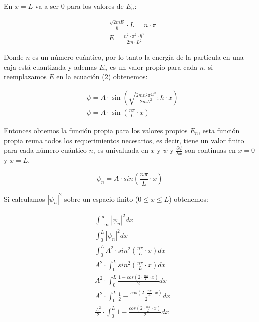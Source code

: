 \documentclass[a4paper]{article}
\begin{document}
        \indent En $x = L$ va a ser 0 para los valores de $E_n$:
        \vspace{-1mm}

        \begin{align*}
            &\frac{\sqrt{2mE}}{\hbar} \cdot L = n \cdot \pi \\
            &E = \frac{n^2 \cdot \pi^2 \cdot \hbar^2}{2m \cdot L^2}
        \end{align*}

        \indent Donde $n$ es un número cuántico, por lo tanto la energía de la partícula en una caja está cuantizada y ademas $E_n$ es un valor propio para cada $n$, si reemplazamos $E$ en la ecuación (2) obtenemos:

        \begin{align*}
            &\psi = A \cdot \sin(\sqrt{\frac{2mn^{2}\pi^{2\hbar^{2}}}{2mL^{2}}} \colon \hbar \cdot x)\\
            &\psi = A \cdot \sin(\frac{n\pi}{L} \cdot x)
        \end{align*}

        \indent Entonces obtemos la función propia para los valores propios $E_n$, esta función propia reuna todos los requerimientos necesarios, es decir, tiene un valor finito para cada número cuántico $n$, es univaluada en $x$ y $\psi$ y $\frac{\partial \psi}{\partial x}$ son continuas en $x = 0$ y $x = L$.

        \begin{equation}
            \psi_n = A \cdot sin(\frac{n\pi}{L} \cdot x)
        \end{equation}

        \indent Si calculamos $\left| \psi_n \right|^{2}$ sobre un espacio finito ($0 \leq x \leq L$) obtenemos:

        \begin{align*}
            &\int_{-\infty}^{\infty} \left| \psi_n \right|^{2} dx \\
            &\int_{0}^{L} \left| \psi_n \right|^{2} dx \\
            &\int_{0}^{L} A^{2} \cdot sin^{2}(\frac{n\pi}{L} \cdot x) dx \\
            &A^{2} \cdot \int_{0}^{L} sin^{2}(\frac{n\pi}{L} \cdot x) dx \\
            &A^{2} \cdot \int_{0}^{L} \frac{1 - cos(2 \cdot \frac{n\pi}{L} \cdot x)}{2} dx \\
            &A^{2} \cdot \int_{0}^{L} \frac{1}{2} - \frac{cos(2 \cdot \frac{n\pi}{L} \cdot x)}{2} dx \\
            &\frac{A^{2}}{2} \cdot \int_{0}^{L} 1 - \frac{cos(2 \cdot \frac{n\pi}{L} \cdot x)}{2} dx\\
        \end{align*}
\end{document}
